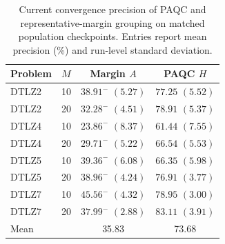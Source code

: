 \begin{table}[t]
\centering
\caption{Current convergence precision of PAQC and representative-margin grouping on matched population checkpoints. Entries report mean precision (\%) and run-level standard deviation.}
\label{tab:exp:ggp}
\begingroup
\setlength{\tabcolsep}{5pt}
\renewcommand{\arraystretch}{1.12}
\small
\begin{tabular*}{0.72\textwidth}{@{\extracolsep{\fill}}lccc@{}}
\toprule
Problem & $M$ & Margin $A$ & PAQC $H$ \\
\midrule
DTLZ2 & 10 & $38.91^{-}$ $(5.27)$ & $\mathbf{77.25}$ $(5.52)$ \\
DTLZ2 & 20 & $32.28^{-}$ $(4.51)$ & $\mathbf{78.91}$ $(5.37)$ \\
DTLZ4 & 10 & $23.86^{-}$ $(8.37)$ & $\mathbf{61.44}$ $(7.55)$ \\
DTLZ4 & 20 & $29.71^{-}$ $(5.22)$ & $\mathbf{66.54}$ $(5.53)$ \\
DTLZ5 & 10 & $39.36^{-}$ $(6.08)$ & $\mathbf{66.35}$ $(5.98)$ \\
DTLZ5 & 20 & $38.96^{-}$ $(4.24)$ & $\mathbf{76.91}$ $(3.77)$ \\
DTLZ7 & 10 & $45.56^{-}$ $(4.32)$ & $\mathbf{78.95}$ $(3.00)$ \\
DTLZ7 & 20 & $37.99^{-}$ $(2.88)$ & $\mathbf{83.11}$ $(3.91)$ \\
\midrule
Mean &  & 35.83 & 73.68 \\
\bottomrule
\end{tabular*}
\endgroup
\end{table}
